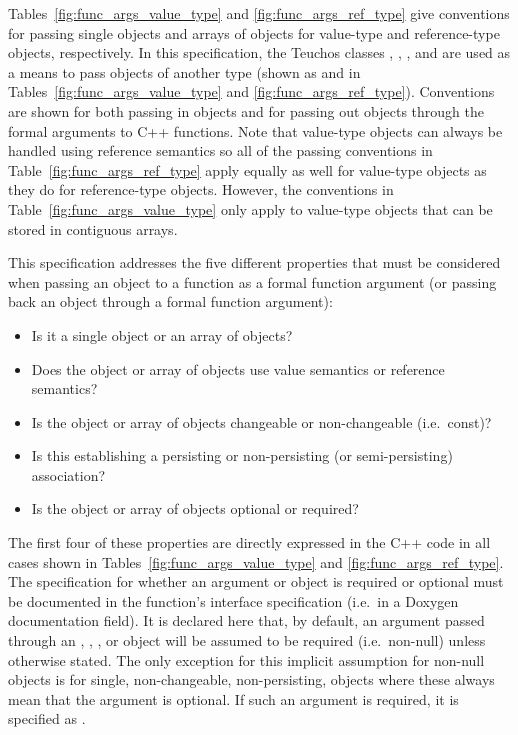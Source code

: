 \documentclass[pdf,ps2pdf,11pt]{SANDreport}
\begin{document}
Tables~\ref{fig:func_args_value_type} and
{}\ref{fig:func_args_ref_type} give conventions for passing single
objects and arrays of objects for value-type {} and reference-type {} objects,
respectively.  In this specification, the Teuchos classes {},
{}, {}, and {} are used as a
means to pass objects of another type (shown as {} and
{} in Tables~\ref{fig:func_args_value_type} and
{}\ref{fig:func_args_ref_type}).  Conventions are shown for both
passing in objects and for passing out objects through the formal
arguments to C++ functions.  Note that value-type objects can always
be handled using reference semantics so all of the passing conventions
in Table~\ref{fig:func_args_ref_type} apply equally as well for
value-type objects as they do for reference-type objects.  However,
the conventions in Table~\ref{fig:func_args_value_type} only apply to
value-type objects that can be stored in contiguous arrays.

This specification addresses the five different properties that must
be considered when passing an object to a function as a formal
function argument (or passing back an object through a formal function
argument):

\begin{itemize}

{}\item Is it a single object or an array of objects?

{}\item Does the object or array of objects use value semantics or
reference semantics?

{}\item Is the object or array of objects changeable or non-changeable
(i.e.\ const)?

{}\item Is this establishing a persisting or non-persisting (or
semi-persisting) association?

{}\item Is the object or array of objects optional or required?

\end{itemize}

The first four of these properties are directly expressed in the C++
code in all cases shown in Tables~\ref{fig:func_args_value_type} and
{}\ref{fig:func_args_ref_type}.  The specification for whether an
argument or object is required or optional must be documented in the
function's interface specification (i.e.\ in a Doxygen documentation
{} field).  It is declared here that, by default, an
argument passed through an {}, {},
{}, or {} object will be assumed to be
required (i.e.\ non-null) unless otherwise stated.  The only exception
for this implicit assumption for non-null objects is {} for single, non-changeable, non-persisting, objects
where these always mean that the argument is optional.  If such an
argument is required, it is specified as {}.
\end{document}
